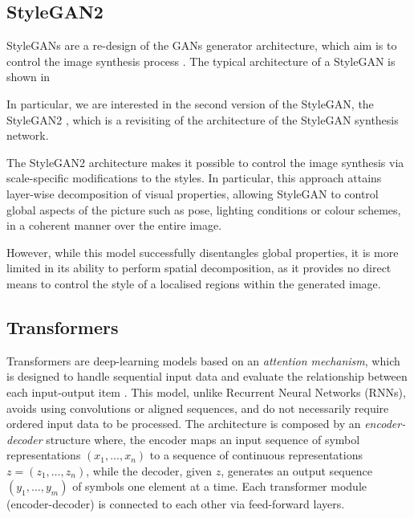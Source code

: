\documentclass{article}
\begin{document}
\subsection{StyleGAN2}\label{sec:StyleGAN}
StyleGANs are a re-design of the GANs generator architecture, which aim is to control the image 
synthesis process \cite{karras2019style}. The typical architecture of a StyleGAN is shown in 

In particular, we are interested in the second version of the StyleGAN, the StyleGAN2 
\cite{karras2020analyzing}, which is a revisiting of the architecture of the StyleGAN synthesis 
network. 

The StyleGAN2 architecture makes it possible to control the image synthesis via scale-specific 
modifications to the styles. In particular, this approach attains layer-wise decomposition of visual 
properties, allowing StyleGAN to control global aspects of the picture such as pose, lighting 
conditions or colour schemes, in a coherent manner over the entire image.

However, while this model successfully disentangles global properties, it is more limited in its ability to perform spatial decomposition, as it provides no direct means to control the style of a localised 
regions within the generated image.

\subsection{Transformers}\label{sec:transformer}
Transformers are deep-learning models based on an \textit{attention mechanism}, which is 
designed 
to handle sequential input data and evaluate the relationship between each input-output item 
\cite{vaswani2017attention}.
This model, unlike Recurrent Neural Networks (RNNs), avoids using convolutions or aligned 
sequences, and do not necessarily require ordered input data to be processed. 
The architecture is composed by an \textit{encoder-decoder} structure where, the {encoder} maps 
an input sequence of symbol representations $(x_1,\dots, x_n)$ to a sequence of continuous 
representations $z = (z_1, \dots, z_n)$, while the  {decoder}, given $z$, generates an output 
sequence $(y_1, \dots, y_m)$ of symbols one element at a time. 
Each transformer module (encoder-decoder) is connected to each other via feed-forward
layers.
\end{document}
